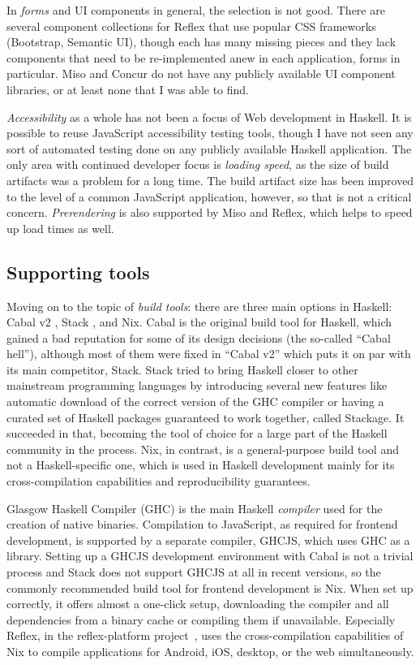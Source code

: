 \documentclass[english,zadani,odsaz]{fitthesis}
\begin{document}
In \emph{forms} and UI components in general, the selection is not good. There are
several component collections for Reflex that use popular CSS frameworks
(Bootstrap, Semantic UI), though each has many missing pieces and they lack
components that need to be re-implemented anew in each application, forms in
particular. Miso and Concur do not have any publicly available UI component
libraries, or at least none that I was able to find.

\emph{Accessibility} as a whole has not been a focus of Web development in Haskell. It
is possible to reuse JavaScript accessibility testing tools, though I have not
seen any sort of automated testing done on any publicly available Haskell
application. The only area with continued developer focus is \emph{loading speed}, as
the size of build artifacts was a problem for a long time. The build artifact
size has been improved to the level of a common JavaScript application, however,
so that is not a critical concern. \emph{Prerendering} is also supported by Miso and
Reflex, which helps to speed up load times as well.

\subsection{Supporting tools}
\label{sec:org14b24de}
Moving on to the topic of \emph{build tools}: there are three main options in Haskell:
Cabal v2 \cite{cabal}, Stack \cite{stack}, and Nix. Cabal is the original build tool
for Haskell, which gained a bad reputation for some of its design decisions (the
so-called ``Cabal hell''), although most of them were fixed in ``Cabal v2'' which
puts it on par with its main competitor, Stack. Stack tried to bring Haskell
closer to other mainstream programming languages by introducing several new
features like automatic download of the correct version of the GHC compiler or
having a curated set of Haskell packages guaranteed to work together, called
Stackage. It succeeded in that, becoming the tool of choice for a large part of
the Haskell community in the process. Nix, in contrast, is a general-purpose
build tool and not a Haskell-specific one, which is used in Haskell development
mainly for its cross-compilation capabilities and reproducibility guarantees.

Glasgow Haskell Compiler (GHC) is the main Haskell \emph{compiler} used for the
creation of native binaries. Compilation to JavaScript, as required for frontend
development, is supported by a separate compiler, GHCJS, which uses GHC as a
library. Setting up a GHCJS development environment with Cabal is not a trivial
process and Stack does not support GHCJS at all in recent versions, so the
commonly recommended build tool for frontend development is Nix. When set up
correctly, it offers almost a one-click setup, downloading the compiler and all
dependencies from a binary cache or compiling them if unavailable. Especially
Reflex, in the reflex-platform project~\cite{reflex-platform}, uses the
cross-compilation capabilities of Nix to compile applications for Android, iOS,
desktop, or the web simultaneously.
\end{document}
